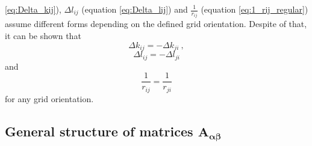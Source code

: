 \documentclass[manuscript]{geophysics}
\begin{document}
\ref{eq:Delta_kij}), $\Delta l_{ij}$ (equation \ref{eq:Delta_lij}) and 
$\tfrac{1}{r_{ij}}$ (equation \ref{eq:1_rij_regular}) assume different 
forms depending on the defined grid orientation.
Despite of that, it can be shown that
\begin{equation}
	\Delta k_{ij} = - \Delta k_{ji} \: ,
	\label{eq:Delta_kij_symmetry}
\end{equation}
\begin{equation}
	\Delta l_{ij} = - \Delta l_{ji}
	\label{eq:Delta_lij_symmetry}
\end{equation}
and 
\begin{equation}
	\frac{1}{r_{ij}} = \frac{1}{r_{ji}}
	\label{eq:1_rij_symmetry}
\end{equation}
for any grid orientation.

\subsection{General structure of matrices $\mathbf{A_{\boldsymbol{\alpha\beta}}}$}
\end{document}
